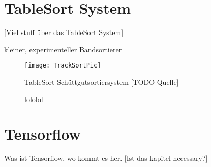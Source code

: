 \section{TableSort System}

[Viel stuff über das TableSort System]

kleiner, experimenteller Bandsortierer \cite{doll2015}

\begin{figure}
	\texttt{[image: TrackSortPic]}
	\caption{TableSort Schüttgutsortiersystem [TODO Quelle]}
	\label{fig:tablesortsystem}
\end{figure}



\begin{figure}
    \centering
    \def\svgwidth{\columnwidth}
	
	\caption{lololol}
\end{figure}

% 	

\section{Tensorflow}

Was ist Tensorflow, wo kommt es her. [Ist das kapitel necessary?]
